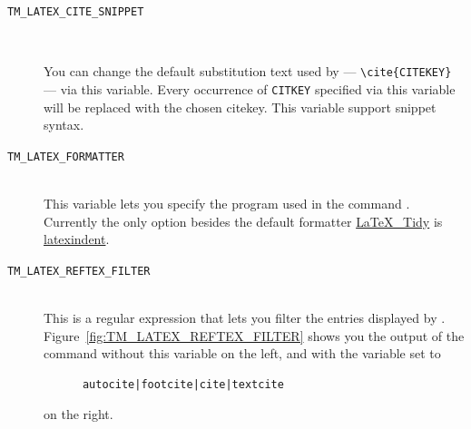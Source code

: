 \documentclass[11pt, x11names]{article}
\begin{document}
\begin{description}

  \item[\texttt{TM\_LATEX\_CITE\_SNIPPET}]~\\

  \begin{sloppypar}
  You can change the default substitution text used by  — \verb|\cite{CITEKEY}| — via this variable. Every occurrence of \texttt{CITKEY} specified via this variable will be replaced with the chosen citekey. This variable support snippet syntax.
  \end{sloppypar}

  \item[\texttt{TM\_LATEX\_FORMATTER}]~\\

  This variable lets you specify the program used in the command . Currently the only option besides the default formatter \href{http://bfc.sfsu.edu/cgi-bin/hsu.pl?LaTeX_Tidy}{LaTeX\_Tidy} is \href{https://github.com/cmhughes/latexindent.pl}{latexindent}.

  \item[\texttt{TM\_LATEX\_REFTEX\_FILTER}]~\\

  This is a regular expression that lets you filter the entries displayed by . Figure~\ref{fig:TM_LATEX_REFTEX_FILTER} shows you the output of the command without this variable on the left, and with the variable set to
  \begin{verbatim}
      autocite|footcite|cite|textcite
  \end{verbatim}
  on the right.


\end{description}
\end{document}
